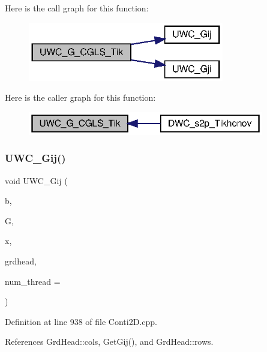 Here is the call graph for this function\+:\nopagebreak
\begin{figure}[H]
\begin{center}
\leavevmode
\includegraphics[width=242pt]{Conti2D_8h_a4a8eda8a2eef4509306c37faad796c2f_a4a8eda8a2eef4509306c37faad796c2f_cgraph}
\end{center}
\end{figure}
Here is the caller graph for this function\+:\nopagebreak
\begin{figure}[H]
\begin{center}
\leavevmode
\includegraphics[width=292pt]{Conti2D_8h_a4a8eda8a2eef4509306c37faad796c2f_a4a8eda8a2eef4509306c37faad796c2f_icgraph}
\end{center}
\end{figure}
\mbox{\label{Conti2D_8h_ac58c50337e14cc142ee9377c561c05fa_ac58c50337e14cc142ee9377c561c05fa}} 
\subsubsection{U\+W\+C\+\_\+\+Gij()\hspace{0.1cm}{\footnotesize\ttfamily [1/2]}}
{\footnotesize\ttfamily void U\+W\+C\+\_\+\+Gij (\begin{DoxyParamCaption}\item[{double $\ast$}]{b,  }\item[{double $\ast$}]{G,  }\item[{double $\ast$}]{x,  }\item[{\textbf{ Grd\+Head}}]{grdhead,  }\item[{int}]{num\+\_\+thread = {} }\end{DoxyParamCaption})}



Definition at line 938 of file Conti2\+D.\+cpp.



References Grd\+Head\+::cols, Get\+Gij(), and Grd\+Head\+::rows.

